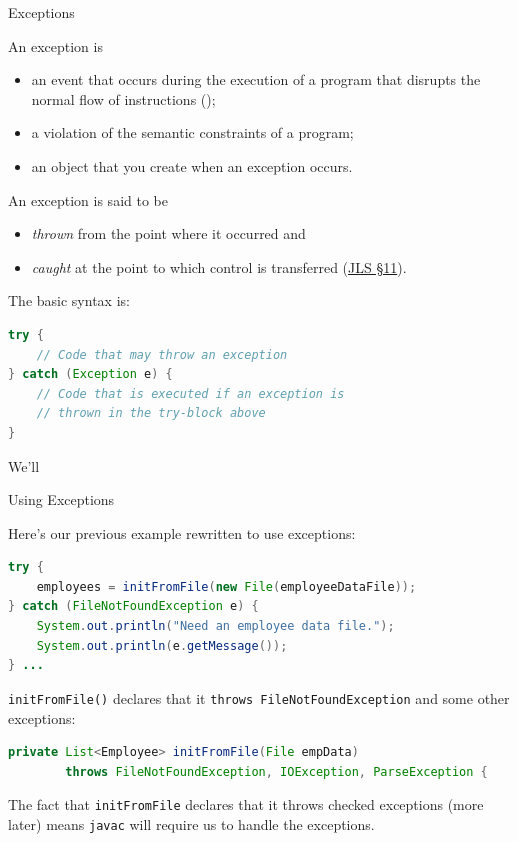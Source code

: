 \documentclass{beamer}
\begin{document}
\begin{frame}[fragile]{Exceptions}


An exception is
\begin{itemize}
\item an event that occurs during the execution of a program that disrupts the normal flow of instructions ();
\item a violation of the semantic constraints of a program;
\item an object that you create when an exception occurs.
\end{itemize}
\vspace{.1in}
An exception is said to be
\begin{itemize}
\item {\it thrown} from the point where it occurred and
\item {\it caught} at the point to which control is transferred (\href{http://docs.oracle.com/javase/specs/jls/se7/html/jls-11.html}{JLS \S 11}).
\end{itemize}
The basic syntax is:
\begin{lstlisting}[language=Java]
try {
    // Code that may throw an exception
} catch (Exception e) {
    // Code that is executed if an exception is
    // thrown in the try-block above
}
\end{lstlisting}
We'll

\end{frame}

\begin{frame}[fragile]{Using Exceptions}


Here's our previous example rewritten to use exceptions:
\begin{lstlisting}[language=Java]
try {
    employees = initFromFile(new File(employeeDataFile));
} catch (FileNotFoundException e) {
    System.out.println("Need an employee data file.");
    System.out.println(e.getMessage());
} ...
\end{lstlisting}
{\tt initFromFile()} declares that it {\tt throws FileNotFoundException} and some other exceptions:
\begin{lstlisting}[language=Java]
private List<Employee> initFromFile(File empData)
        throws FileNotFoundException, IOException, ParseException {
\end{lstlisting}

The fact that {\tt initFromFile} declares that it throws checked exceptions (more later) means {\tt javac} will require us to handle the exceptions.

\end{frame}
\end{document}
